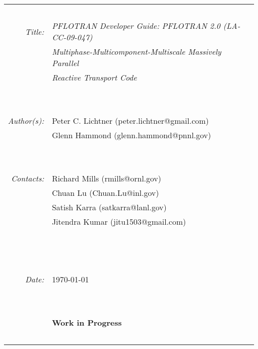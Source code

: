 \begin{comment}
\noindent
{\large\sffamily LA-UR-06-7048}

\medskip

\noindent
\scriptsize
{\em Approved for public release;}\\
{\em distribution is unlimited.}
\end{comment}

\normalsize

\bc
\begin{tabular}{r|l}
~ & ~\\
{\em Title:} & {\sl PFLOTRAN Developer Guide: PFLOTRAN 2.0 (LA-CC-09-047)}\\
~ & {\sl Multiphase-Multicomponent-Multiscale Massively Parallel} \\
~ & {\sl Reactive Transport Code}\\
~ & ~\\
~ & ~\\
{\em Author(s):} & Peter C. Lichtner (peter.lichtner@gmail.com)\\
~  & Glenn Hammond (glenn.hammond@pnnl.gov)\\
~ & ~\\
~ & ~\\
{\em Contacts:}  & Richard Mills (rmills@ornl.gov)\\
~ & Chuan Lu (Chuan.Lu@inl.gov)\\
~ & Satish Karra (satkarra@lanl.gov)\\
~ & Jitendra Kumar (jitu1503@gmail.com)\\
~ & \\%
~ & ~\\
~ & ~\\
{\em Date:} & \today \\
~ & ~\\
~ & ~\\
~ & {\bf \large Work in Progress}\\
~ & ~\\
\end{tabular}
\ec

